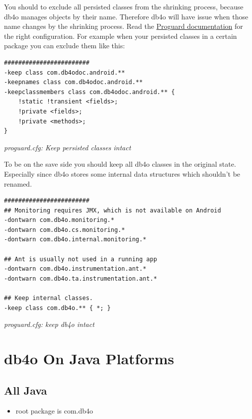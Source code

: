 You should to exclude all persisted classes from the shrinking process, because db4o manages objects by their name. Therefore db4o will have issue when those name changes by the shrinking process. Read the \href{http://proguard.sourceforge.net/index.html\#/manual/usage.html}{Proguard documentation} for the right configuration. For example when your persisted classes in a certain package you can exclude them like this:

\begin{lstlisting}
########################
-keep class com.db4odoc.android.**
-keepnames class com.db4odoc.android.**
-keepclassmembers class com.db4odoc.android.** {
    !static !transient <fields>;
    !private <fields>;
    !private <methods>;
}
\end{lstlisting}

{\small\itshape proguard.cfg: Keep persisted classes intact\par}
\medskip

To be on the save side you should keep all db4o classes in the original state. Especially since db4o stores some internal data structures which shouldn't be renamed.

\begin{lstlisting}
########################
## Monitoring requires JMX, which is not available on Android
-dontwarn com.db4o.monitoring.*
-dontwarn com.db4o.cs.monitoring.*
-dontwarn com.db4o.internal.monitoring.*

## Ant is usually not used in a running app
-dontwarn com.db4o.instrumentation.ant.*
-dontwarn com.db4o.ta.instrumentation.ant.*

## Keep internal classes.
-keep class com.db4o.** { *; }
\end{lstlisting}

{\small\itshape proguard.cfg: keep db4o intact\par}
\medskip

\section{db4o On Java Platforms}
\label{ref:platform-specific-issues-db4o-on-java-platforms}

\subsection*{All Java}

\begin{itemize}
\item root package is com.db4o
\end{itemize}

